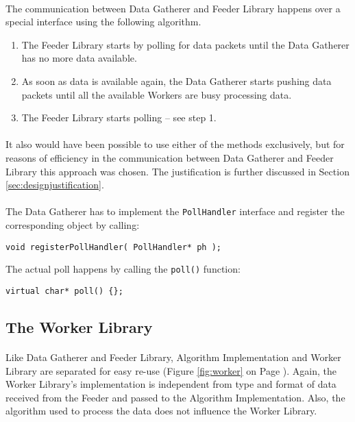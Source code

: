 \paragraph{}
The communication between Data Gatherer and Feeder Library happens over a special interface using the following algorithm.

\begin{enumerate}
\item The Feeder Library starts by polling for data packets until the Data Gatherer has no more data available.
\item As soon as data is available again, the Data Gatherer starts pushing data packets until all the available Workers are busy processing data.
\item The Feeder Library starts polling -- see step 1.
\end{enumerate}

\paragraph{}
It also would have been possible to use either of the methods exclusively, but for reasons of efficiency in the communication between Data Gatherer and Feeder Library this approach was chosen. The justification is further discussed in Section \ref{sec:designjustification}.

\paragraph{}
The Data Gatherer has to implement the \texttt{PollHandler} interface and register the corresponding object by calling:
\begin{flushleft}
\texttt{void registerPollHandler( PollHandler* ph );}
\end{flushleft}
The actual poll happens by calling the \texttt{poll()} function:
\begin{flushleft}
\texttt{virtual char* poll() \{\};}
\end{flushleft}


\subsection{The Worker Library}
\label{sec:workerlib}
\paragraph{}
Like Data Gatherer and Feeder Library, Algorithm Implementation and Worker Library are separated for easy re-use (Figure \ref{fig:worker} on Page \pageref{fig:worker}). Again, the Worker Library's implementation is independent from type and format of data received from the Feeder and passed to the Algorithm Implementation. Also, the algorithm used to process the data does not influence the Worker Library.

